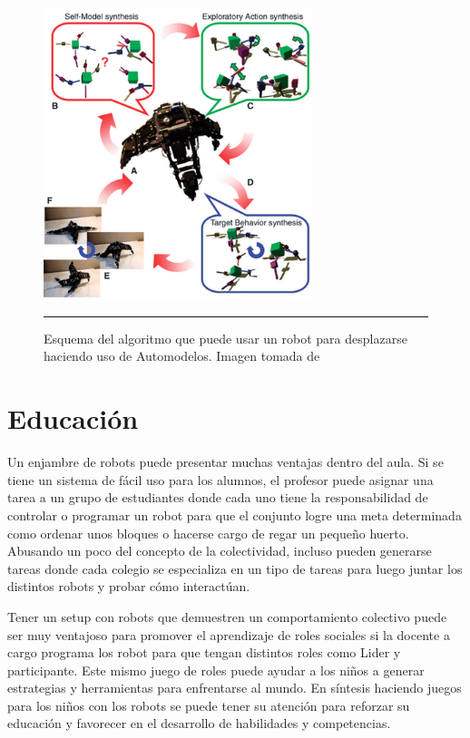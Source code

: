 \begin{figure}[htbp]
	\centering
		\includegraphics[width=0.7\textwidth]{./Figures/algoritmo_automodelo.png}
		\rule{35em}{0.5pt}
	\caption[Esquema algoritmo automodelado Hod Lipson]{Esquema del algoritmo que puede usar un robot para desplazarse haciendo uso de Automodelos. Imagen tomada de \cite{Bongard17112006}}
	\label{fig:AutomodeladoLIPSON}
\end{figure}


\section{Educación}

Un enjambre de robots puede presentar muchas ventajas dentro del aula. Si se tiene un sistema de fácil uso para los alumnos, el profesor puede asignar una tarea a un grupo de estudiantes donde cada uno tiene la responsabilidad de controlar o programar un robot para que el conjunto logre una meta determinada como ordenar unos bloques o hacerse cargo de regar un pequeño huerto. Abusando un poco del concepto de la colectividad, incluso pueden generarse tareas donde cada colegio se especializa en un tipo de tareas para luego juntar los distintos robots y probar cómo interactúan.

Tener un setup con robots que demuestren un comportamiento colectivo puede ser muy ventajoso para promover el aprendizaje de roles sociales si la docente a cargo programa los robot para que tengan distintos roles como Lider y participante. Este mismo juego de roles puede ayudar a los niños a generar estrategias y herramientas para enfrentarse al mundo. En síntesis haciendo juegos para los niños con los robots se puede tener su atención para reforzar su educación y favorecer en el desarrollo de habilidades y competencias. 

